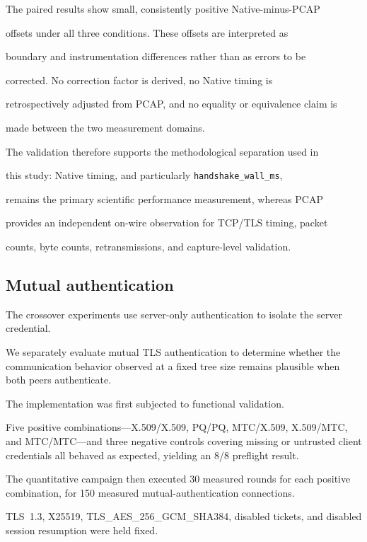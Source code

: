 \documentclass[journal]{IEEEtran}
\begin{document}
The paired results show small, consistently positive Native-minus-PCAP

offsets under all three conditions. These offsets are interpreted as

boundary and instrumentation differences rather than as errors to be

corrected. No correction factor is derived, no Native timing is

retrospectively adjusted from PCAP, and no equality or equivalence claim is

made between the two measurement domains.



The validation therefore supports the methodological separation used in

this study: Native timing, and particularly \texttt{handshake\_wall\_ms},

remains the primary scientific performance measurement, whereas PCAP

provides an independent on-wire observation for TCP/TLS timing, packet

counts, byte counts, retransmissions, and capture-level validation.



\subsection{Mutual authentication}

\label{sec:mutual-auth}



The crossover experiments use server-only authentication to isolate the server credential.

We separately evaluate mutual TLS authentication to determine whether the communication behavior observed at a fixed tree size remains plausible when both peers authenticate.



The implementation was first subjected to functional validation.

Five positive combinations---X.509/X.509, PQ/PQ, MTC/X.509, X.509/MTC, and MTC/MTC---and three negative controls covering missing or untrusted client credentials all behaved as expected, yielding an 8/8 preflight result.

The quantitative campaign then executed 30 measured rounds for each positive combination, for 150 measured mutual-authentication connections.

TLS~1.3, X25519, TLS\_AES\_256\_GCM\_SHA384, disabled tickets, and disabled session resumption were held fixed.
\end{document}
